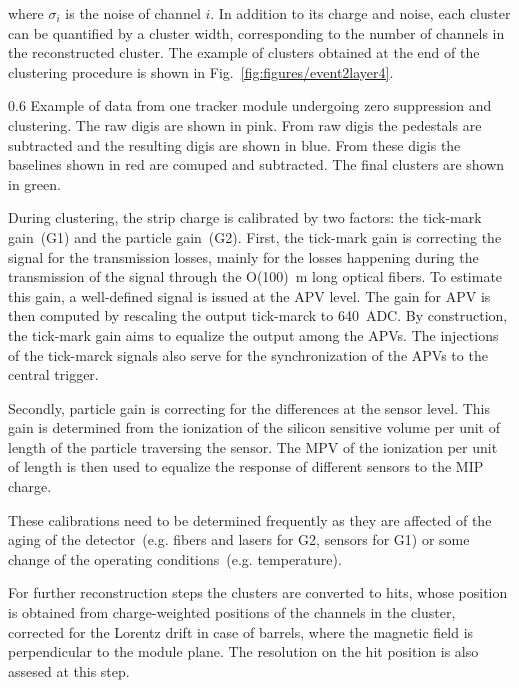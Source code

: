 where $\sigma_{i}$ is the noise of channel $i$. In addition to its charge and noise, each cluster can be quantified by a cluster width, corresponding to the number of channels in the reconstructed cluster. The example of clusters obtained at the end of the clustering procedure is shown in Fig.~\ref{fig:figures/event2layer4}.

                 {0.6}       %
                 {Example of data from one tracker module undergoing zero suppression and clustering. The raw digis are shown in pink. From raw digis the pedestals are subtracted and the resulting digis are shown in blue. From these digis the baselines shown in red are comuped and subtracted. The final clusters are shown in green.} %

During clustering, the strip charge is calibrated by two factors: the tick-mark gain~(G1) and the particle gain~(G2). First, the tick-mark gain is correcting the signal for the transmission losses, mainly for the losses happening during the transmission of the signal through the O(100)~m long optical fibers. To estimate this gain, a well-defined signal is issued at the APV level. The gain for APV is then computed by rescaling the output tick-marck to 640~ADC. By construction, the tick-mark gain aims to equalize the output among the APVs. The injections of the tick-marck signals also serve for the synchronization of the APVs to the central trigger.

Secondly, particle gain is correcting for the differences at the sensor level. This gain is determined from the ionization of the silicon sensitive volume per unit of length of the particle traversing the sensor. The MPV of the ionization per unit of length is then used to equalize the response of different sensors to the MIP charge. 

These calibrations need to be determined frequently as they are affected of the aging of the detector~(e.g. fibers and lasers for G2,  sensors for G1) or some change of the operating conditions~(e.g. temperature).

For further reconstruction steps the clusters are converted to hits, whose position is obtained from charge-weighted positions of the channels in the cluster, corrected for the Lorentz drift in case of barrels, where the magnetic field is perpendicular to the module plane. The resolution on the hit position is also assesed at this step.

